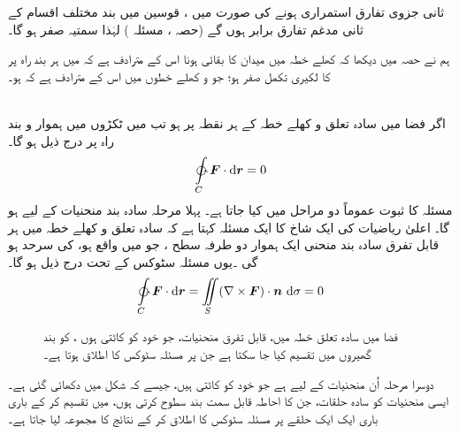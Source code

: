 ثانی  جزوی تفارق استمراری ہونے کی صورت میں  ، قوسین میں بند  مختلف اقسام کے ثانی   مدغم تفارق  برابر ہوں گے   (حصہ ، مسئلہ ) لہٰذا سمتیہ صفر ہو گا۔

ہم نے حصہ  میں دیکھا  کہ کھلے خطہ  میں میدان  کا بقائی ہونا اس کے مترادف ہے کہ   میں ہر بند راہ پر  کا لکیری تکمل صفر ہو؛  جو      و  کھلے خطوں میں   اس کے مترادف ہے کہ ہو۔

   \\
اگر فضا میں سادہ تعلق و  کھلے خطہ  کے ہر نقطہ پر  ہو تب  میں  ٹکڑوں میں  ہموار و  بند راہ  پر درج ذیل ہو گا۔
\begin{align*}
\ointctrclockwise\limits_C \kvec{F}\cdot\dif\kvec{r}=0
\end{align*}
\quad
مسئلہ   کا ثبوت عموماً دو مراحل میں  کیا جاتا ہے۔ پہلا مرحلہ سادہ بند منحنیات کے لیے ہو گا۔ اعلیٰ ریاضیات کی ایک شاخ    کا ایک مسئلہ  کہتا ہے کہ سادہ تعلق  و کھلے خطہ  میں ہر قابل تفرق   سادہ بند منحنی    ایک ہموار دو طرفہ سطح ،   جو  میں واقع ہو، کی سرحد ہو گی ۔یوں مسئلہ سٹوکس کے تحت درج ذیل ہو گا۔
\begin{align*}
\ointctrclockwise\limits_C \kvec{F} \cdot \dif\kvec{r}=\iint\limits_S(\nabla \times \kvec{F}) \cdot \an\, \dif\sigma= 0
\end{align*}

\begin{figure}
\centering
{}
\caption
{فضا میں سادہ تعلق  خطہ میں،  قابل تفرق منحنیات، جو خود کو کاٹتی ہوں ، کو بند  گھیروں   میں تقسیم کیا جا سکتا ہے جن پر مسئلہ سٹوکس کا اطلاق ہوتا ہے۔}
\label{شکل_منحنی_خود_کو_کاٹتی}
\end{figure}
دوسرا مرحلہ اُن منحنیات کے لیے ہے جو خود کو کاٹتی ہیں، جیسے کہ شکل میں دکھائی  گئی ہے۔ ایسی منحنیات کو سادہ  حلقات، جن  کا احاطہ قابل سمت بند سطوح کرتی ہوں،  میں تقسیم کر کے باری باری ایک ایک حلقے پر مسئلہ سٹوکس کا اطلاق کر کے نتائج کا مجموعہ لیا جاتا ہے۔

